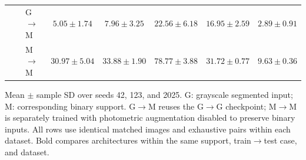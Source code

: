 \begin{table}[!t]
\begin{tabular*}{\textwidth}{@{\extracolsep{\fill}}lllccccc@{}}
 &  & G$\to$M & $5.05\pm1.74$ & $7.96\pm3.25$ & $22.56\pm6.18$ & $16.95\pm2.59$ & $2.89\pm0.91$ \\
 &  & M$\to$M & $30.97\pm5.04$ & $33.88\pm1.90$ & $78.77\pm3.88$ & $31.72\pm0.77$ & $9.63\pm0.36$ \\
\bottomrule
\end{tabular*}
\par\vspace{3pt}
\begin{minipage}{\textwidth}\footnotesize
Mean $\pm$ sample SD over seeds 42, 123, and 2025. G: grayscale segmented input; M: corresponding binary support.
G$\to$M reuses the G$\to$G checkpoint; M$\to$M is separately trained with photometric augmentation disabled to preserve binary inputs.
All rows use identical matched images and exhaustive pairs within each dataset. Bold compares architectures within the same support, train$\to$test case, and dataset.
\end{minipage}
\endgroup
\end{table}
